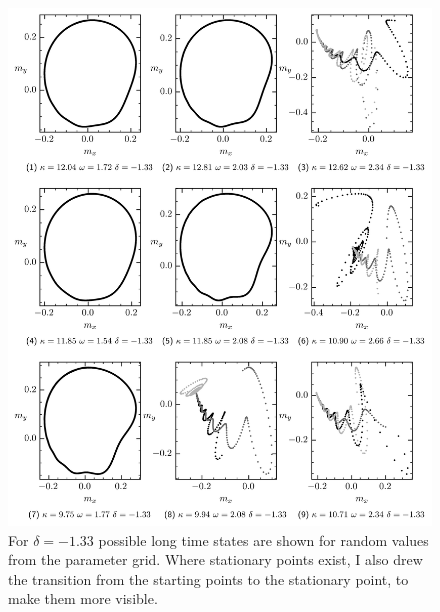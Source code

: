     \begin{figure}[H]
        \centering
        \includegraphics{pictures/lc_traj_dcut2.png}
        \caption{For $\delta=-1.33$ possible long time states are shown for random values from the parameter grid. Where stationary points exist, I also drew the transition from the starting points to the stationary point, to make them more visible.}
    \end{figure}\newpage

